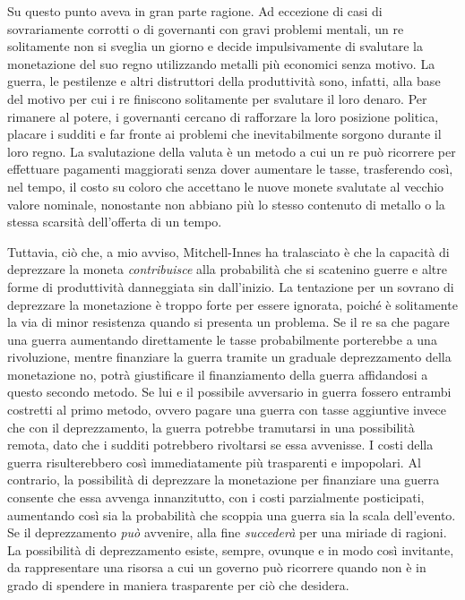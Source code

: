 \documentclass[
  a5paper,
  smalldemyvopaper,10pt,twoside,onecolumn,openright,extrafontsizes,hidelinks]{memoir}
\begin{document}
Su questo punto aveva in gran parte ragione. Ad eccezione di casi di
sovrariamente corrotti o di governanti con gravi problemi mentali, un re
solitamente non si sveglia un giorno e decide impulsivamente di
svalutare la monetazione del suo regno utilizzando metalli più economici
senza motivo. La guerra, le pestilenze e altri distruttori della
produttività sono, infatti, alla base del motivo per cui i re finiscono
solitamente per svalutare il loro denaro. Per rimanere al potere, i
governanti cercano di rafforzare la loro posizione politica, placare i
sudditi e far fronte ai problemi che inevitabilmente sorgono durante il
loro regno. La svalutazione della valuta è un metodo a cui un re può
ricorrere per effettuare pagamenti maggiorati senza dover aumentare le
tasse, trasferendo così, nel tempo, il costo su coloro che accettano le
nuove monete svalutate al vecchio valore nominale, nonostante non
abbiano più lo stesso contenuto di metallo o la stessa scarsità
dell'offerta di un tempo.

Tuttavia, ciò che, a mio avviso, Mitchell-Innes ha tralasciato è che la
capacità di deprezzare la moneta \emph{contribuisce} alla probabilità
che si scatenino guerre e altre forme di produttività danneggiata sin
dall'inizio. La tentazione per un sovrano di deprezzare la monetazione è
troppo forte per essere ignorata, poiché è solitamente la via di minor
resistenza quando si presenta un problema. Se il re sa che pagare una
guerra aumentando direttamente le tasse probabilmente porterebbe a una
rivoluzione, mentre finanziare la guerra tramite un graduale
deprezzamento della monetazione no, potrà giustificare il finanziamento
della guerra affidandosi a questo secondo metodo. Se lui e il possibile
avversario in guerra fossero entrambi costretti al primo metodo, ovvero
pagare una guerra con tasse aggiuntive invece che con il deprezzamento,
la guerra potrebbe tramutarsi in una possibilità remota, dato che i
sudditi potrebbero rivoltarsi se essa avvenisse. I costi della guerra
risulterebbero così immediatamente più trasparenti e impopolari. Al
contrario, la possibilità di deprezzare la monetazione per finanziare
una guerra consente che essa avvenga innanzitutto, con i costi
parzialmente posticipati, aumentando così sia la probabilità che scoppia
una guerra sia la scala dell'evento. Se il deprezzamento \emph{può}
avvenire, alla fine \emph{succederà} per una miriade di ragioni. La
possibilità di deprezzamento esiste, sempre, ovunque e in modo così
invitante, da rappresentare una risorsa a cui un governo può ricorrere
quando non è in grado di spendere in maniera trasparente per ciò che
desidera.
\end{document}
